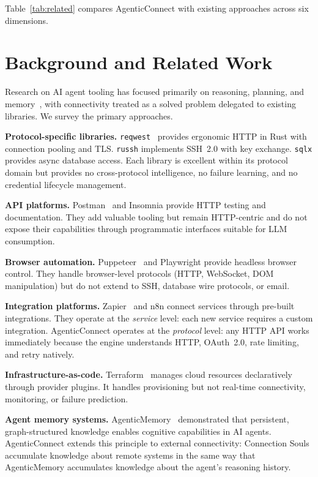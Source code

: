 \documentclass[10pt, twocolumn]{article}
\begin{document}
Table~\ref{tab:related} compares AgenticConnect with existing approaches across six dimensions.

\section{Background and Related Work}
\label{sec:related}

Research on AI agent tooling has focused primarily on reasoning, planning, and memory~\cite{owolabi2026amem}, with connectivity treated as a solved problem delegated to existing libraries. We survey the primary approaches.

\textbf{Protocol-specific libraries.} \texttt{reqwest}~\cite{reqwest2024} provides ergonomic HTTP in Rust with connection pooling and TLS. \texttt{russh} implements SSH~2.0 with key exchange. \texttt{sqlx} provides async database access. Each library is excellent within its protocol domain but provides no cross-protocol intelligence, no failure learning, and no credential lifecycle management.

\textbf{API platforms.} Postman~\cite{postman2024} and Insomnia provide HTTP testing and documentation. They add valuable tooling but remain HTTP-centric and do not expose their capabilities through programmatic interfaces suitable for LLM consumption.

\textbf{Browser automation.} Puppeteer~\cite{puppeteer2024} and Playwright provide headless browser control. They handle browser-level protocols (HTTP, WebSocket, DOM manipulation) but do not extend to SSH, database wire protocols, or email.

\textbf{Integration platforms.} Zapier~\cite{zapier2024} and n8n connect services through pre-built integrations. They operate at the \emph{service} level: each new service requires a custom integration. AgenticConnect operates at the \emph{protocol} level: any HTTP API works immediately because the engine understands HTTP, OAuth~2.0, rate limiting, and retry natively.

\textbf{Infrastructure-as-code.} Terraform~\cite{terraform2024} manages cloud resources declaratively through provider plugins. It handles provisioning but not real-time connectivity, monitoring, or failure prediction.

\textbf{Agent memory systems.} AgenticMemory~\cite{owolabi2026amem} demonstrated that persistent, graph-structured knowledge enables cognitive capabilities in AI agents. AgenticConnect extends this principle to external connectivity: Connection Souls accumulate knowledge about remote systems in the same way that AgenticMemory accumulates knowledge about the agent's reasoning history.
\end{document}
